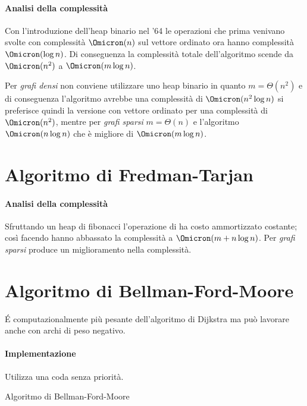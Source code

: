 \paragraph{Analisi della complessità}
Con l'introduzione dell'heap binario nel '64 le operazioni che prima venivano svolte con complessità \(\Omicron(n)\) sul vettore ordinato ora hanno complessità \(\Omicron(\log n)\).
Di conseguenza la complessità totale dell'algoritmo scende da \(\Omicron(n^2)\) a \(\Omicron(m \log n)\).

Per \emph{grafi densi} non conviene utilizzare uno heap binario in quanto \(m = \Theta(n^2)\) e di conseguenza l'algoritmo avrebbe una complessità di \(\Omicron(n^2 \log n)\) si preferisce quindi la versione con vettore ordinato per una complessità di \(\Omicron(n^2)\), mentre per \emph{grafi sparsi} \(m = \Theta(n)\) e l'algoritmo \(\Omicron(n \log n)\) che è migliore di \(\Omicron(m \log n)\).

\section{Algoritmo di Fredman-Tarjan}

\paragraph{Analisi della complessità}
Sfruttando un heap di fibonacci l'operazione di \heapDecrease ha costo ammortizzato costante; così facendo hanno abbassato la complessità a \(\Omicron(m + n \log n)\).
Per \emph{grafi sparsi} produce un miglioramento nella complessità.

\section{Algoritmo di Bellman-Ford-Moore}

\begin{note}
\'E computazionalmente più pesante dell'algoritmo di Dijkstra ma può lavorare anche con archi di peso negativo.
\end{note}

\paragraph{Implementazione}
Utilizza una coda senza priorità.

\begin{algorithm}[H]
	\caption{Algoritmo di Bellman-Ford-Moore}
	
\end{algorithm}

